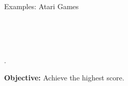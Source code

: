 \documentclass{beamer}
\begin{document}
	\begin{frame}{Examples: Atari Games}
		\begin{minipage}{3cm}
			\begin{figure}[h!]
				\centering
				 \\
				                    \\
				 \\
			\end{figure}
		\end{minipage}%
		\begin{minipage}{1cm}
			.
		\end{minipage}%
		\begin{minipage}{7cm}
			\textbf{Objective:} Achieve the highest score.
			

\end{minipage}
\end{frame}
\end{document}
